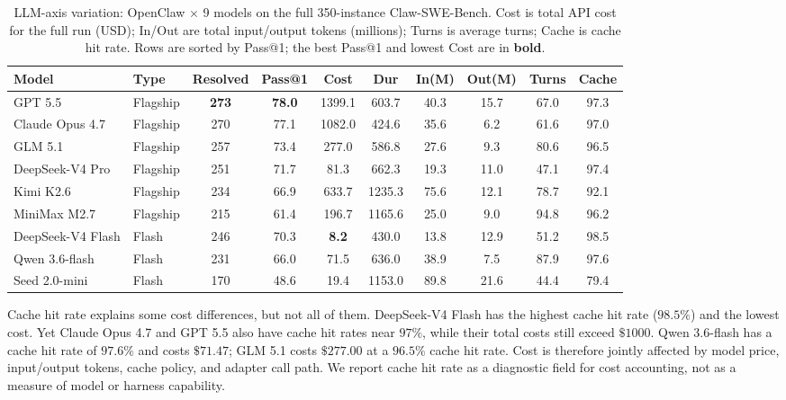 \begin{table}[t]
  \centering
  \scriptsize
  \renewcommand{\arraystretch}{1}
  \setlength{\tabcolsep}{3.3pt}
  \caption{LLM-axis variation: OpenClaw $\times$ 9 models on the full 350-instance Claw-SWE-Bench. Cost is total API cost for the full run (USD); In/Out are total input/output tokens (millions); Turns is average turns; Cache is cache hit rate. Rows are sorted by Pass@1; the best Pass@1 and lowest Cost are in \textbf{bold}.}
  \label{tab:a2}
  \begin{tabular*}{0.95\linewidth}{@{\extracolsep{\fill}}ll|cccccccc@{}}
    \toprule
    \textbf{Model} & \textbf{Type} & \textbf{Resolved} & \textbf{Pass@1} & \textbf{Cost} & \textbf{Dur} & \textbf{In(M)} & \textbf{Out(M)} & \textbf{Turns} & \textbf{Cache} \\
    \midrule
    GPT 5.5             & Flagship & \textbf{273} & \textbf{78.0} & 1399.1 & 603.7 & 40.3 & 15.7 & 67.0 & 97.3 \\
    Claude Opus 4.7     & Flagship & 270 & 77.1 & 1082.0 & 424.6 & 35.6 & 6.2  & 61.6 & 97.0 \\
    GLM 5.1             & Flagship & 257 & 73.4 & 277.0  & 586.8 & 27.6 & 9.3  & 80.6 & 96.5 \\
    DeepSeek-V4 Pro     & Flagship & 251 & 71.7 & 81.3   & 662.3 & 19.3 & 11.0 & 47.1 & 97.4 \\
    Kimi K2.6            & Flagship & 234 & 66.9 & 633.7  & 1235.3& 75.6 & 12.1 & 78.7 & 92.1 \\
    MiniMax M2.7        & Flagship & 215 & 61.4 & 196.7  & 1165.6& 25.0 & 9.0  & 94.8 & 96.2 \\
    \midrule
    DeepSeek-V4 Flash   & Flash    & 246 & 70.3 & \textbf{8.2}   & 430.0 & 13.8 & 12.9 & 51.2 & 98.5 \\
    Qwen 3.6-flash      & Flash    & 231 & 66.0 & 71.5   & 636.0 & 38.9 & 7.5  & 87.9 & 97.6 \\
    Seed 2.0-mini       & Flash    & 170 & 48.6 & 19.4   & 1153.0& 89.8 & 21.6 & 44.4 & 79.4 \\
    \bottomrule
  \end{tabular*}
\end{table}

Cache hit rate explains some cost differences, but not all of them. DeepSeek-V4 Flash has the highest cache hit rate ($98.5\%$) and the lowest cost. Yet Claude Opus 4.7 and GPT 5.5 also have cache hit rates near $97\%$, while their total costs still exceed $\$1000$. Qwen 3.6-flash has a cache hit rate of $97.6\%$ and costs $\$71.47$; GLM 5.1 costs $\$277.00$ at a $96.5\%$ cache hit rate. Cost is therefore jointly affected by model price, input/output tokens, cache policy, and adapter call path. We report cache hit rate as a diagnostic field for cost accounting, not as a measure of model or harness capability.

